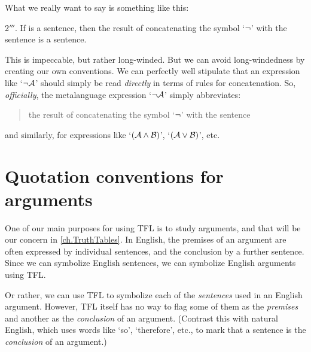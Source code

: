 What we really want to say is something like this:
	\begin{numberlist}
		\item[2$'''$.] If  is a sentence, then the result of concatenating the symbol `$\neg$' with the sentence  is a sentence.
	\end{numberlist}
This is impeccable, but rather long-winded. %
But we can avoid long-windedness by creating our own conventions. We can perfectly well stipulate that an expression like `$\neg \mathcal{A}$' should simply be read \emph{directly} in terms of rules for concatenation. So, \emph{officially}, the metalanguage expression `$\neg \mathcal{A}$'
simply abbreviates:
\begin{quote}
	the result of concatenating the symbol `$\neg$' with the sentence 
\end{quote}
and similarly, for expressions like `$(\mathcal{A} \wedge \mathcal{B})$', `$(\mathcal{A} \vee \mathcal{B})$', etc.


\section{Quotation conventions for arguments}
One of our main purposes for using TFL is to study arguments, and that will be our concern in \cref{ch.TruthTables}. In English, the premises of an argument are often expressed by individual sentences, and the conclusion by a further sentence. Since we can symbolize English sentences, we can symbolize English arguments using TFL.

Or rather, we can use TFL to symbolize each of the \emph{sentences} used in an English argument. However, TFL itself has no way to flag some of them as the \emph{premises} and another as the \emph{conclusion} of an argument.  (Contrast this with natural English, which uses words like `so', `therefore', etc., to mark that a sentence is the \emph{conclusion} of an argument.)

